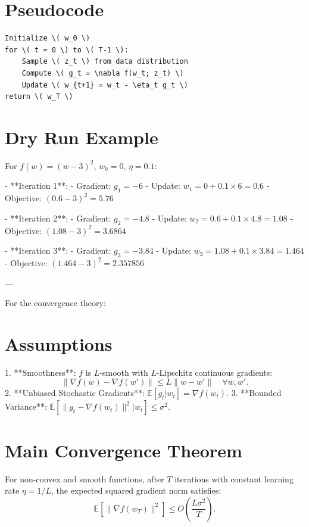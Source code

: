 \section*{Pseudocode}

\begin{verbatim}
Initialize \( w_0 \)
for \( t = 0 \) to \( T-1 \):
    Sample \( z_t \) from data distribution
    Compute \( g_t = \nabla f(w_t; z_t) \)
    Update \( w_{t+1} = w_t - \eta_t g_t \)
return \( w_T \)
\end{verbatim}

\section*{Dry Run Example}

For \( f(w) = (w - 3)^2 \), \( w_0 = 0 \), \( \eta = 0.1 \):

- **Iteration 1**:
  - Gradient: \( g_1 = -6 \)
  - Update: \( w_1 = 0 + 0.1 \times 6 = 0.6 \)
  - Objective: \( (0.6 - 3)^2 = 5.76 \)

- **Iteration 2**:
  - Gradient: \( g_2 = -4.8 \)
  - Update: \( w_2 = 0.6 + 0.1 \times 4.8 = 1.08 \)
  - Objective: \( (1.08 - 3)^2 = 3.6864 \)

- **Iteration 3**:
  - Gradient: \( g_3 = -3.84 \)
  - Update: \( w_3 = 1.08 + 0.1 \times 3.84 = 1.464 \)
  - Objective: \( (1.464 - 3)^2 = 2.357856 \)

---

For the convergence theory:

\section*{Assumptions}

1. **Smoothness**: \( f \) is \( L \)-smooth with \( L \)-Lipschitz continuous gradients:
   \[
   \|\nabla f(w) - \nabla f(w')\| \leq L \|w - w'\| \quad \forall w, w'.
   \]
2. **Unbiased Stochastic Gradients**: \( \mathbb{E}[g_t | w_t] = \nabla f(w_t) \).
3. **Bounded Variance**: \( \mathbb{E}[\|g_t - \nabla f(w_t)\|^2 | w_t] \leq \sigma^2 \).

\section*{Main Convergence Theorem}

For non-convex and smooth functions, after \( T \) iterations with constant learning rate \( \eta = 1/L \), the expected squared gradient norm satisfies:
\[
\mathbb{E}\left[\|\nabla f(w_T)\|^2\right] \leq O\left(\frac{L \sigma^2}{T}\right).
\]

